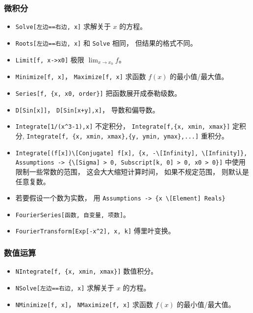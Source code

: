 \subsubsection{微积分}
\begin{itemize}
\item \verb|Solve[左边==右边, x]| 求解关于 $x$ 的方程。
\item \verb|Roots[左边==右边, x]| 和 \verb|Solve| 相同， 但结果的格式不同。
\item \verb|Limit[f, x->x0]| 极限 $\lim_{x\to x_0} f$。
\item \verb|Minimize[f, x]|， \verb|Maximize[f, x]| 求函数 $f(x)$ 的最小值/最大值。
\item \verb|Series[f, {x, x0, order}]| 把函数展开成泰勒级数。
\item \verb|D[Sin[x]]|， \verb|D[Sin[x+y],x]|， 导数和偏导数。
\item \verb|Integrate[1/(x^3-1),x]| 不定积分， \verb|Integrate[f,{x, xmin, xmax}]| 定积分, \verb|Integrate[f, {x, xmin, xmax},{y, ymin, ymax},...]| 重积分。
\item \verb|Integrate[(f[x])\[Conjugate] f[x], {x, -\[Infinity], \[Infinity]}, Assumptions -> {\[Sigma] > 0, Subscript[k, 0] > 0, x0 > 0}]| 中使用限制一些常数的范围， 这会大大缩短计算时间， 如果不规定范围， 则默认是任意复数。
\item 若要假设一个数为实数， 用 \verb|Assumptions -> {x \[Element] Reals}|
\item \verb|FourierSeries[函数, 自变量, 项数]|。
\item \verb|FourierTransform[Exp[-x^2], x, k]| 傅里叶变换。
\end{itemize}

\subsubsection{数值运算}
\begin{itemize}
\item \verb|NIntegrate[f, {x, xmin, xmax}]| 数值积分。
\item \verb|NSolve[左边==右边, x]| 求解关于 $x$ 的方程。
\item \verb|NMinimize[f, x]|， \verb|NMaximize[f, x]| 求函数 $f(x)$ 的最小值/最大值。
\end{itemize}

